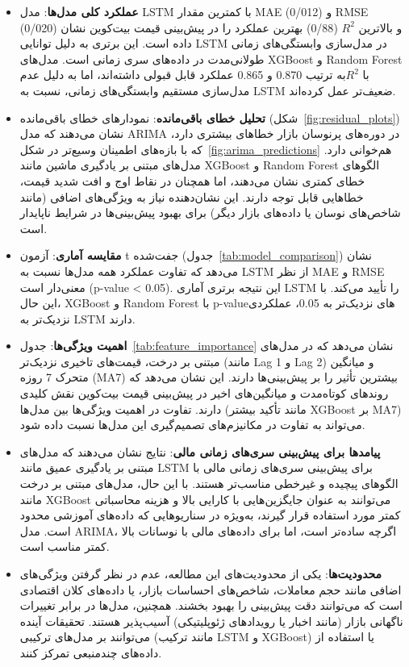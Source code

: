 \begin{itemize}
	\item \textbf{عملکرد کلی مدل‌ها}: مدل LSTM با کمترین مقدار MAE (0/012) و RMSE (0/020) و بالاترین $ R^2 $ (0/88) بهترین عملکرد را در پیش‌بینی قیمت بیت‌کوین نشان داده است. این برتری به دلیل توانایی LSTM در مدل‌سازی وابستگی‌های زمانی طولانی‌مدت در داده‌های سری زمانی است. مدل‌های XGBoost و Random Forest با $ R^2 $به ترتیب 0.870 و 0.865 عملکرد قابل قبولی داشته‌اند، اما به دلیل عدم مدل‌سازی مستقیم وابستگی‌های زمانی، نسبت به LSTM ضعیف‌تر عمل کرده‌اند.
	
	\item \textbf{تحلیل خطای باقی‌مانده}: نمودارهای خطای باقی‌مانده (شکل~\ref{fig:residual_plots}) نشان می‌دهند که مدل ARIMA در دوره‌های پرنوسان بازار خطاهای بیشتری دارد، که با بازه‌های اطمینان وسیع‌تر در شکل~\ref{fig:arima_predictions} هم‌خوانی دارد. مدل‌های مبتنی بر یادگیری ماشین مانند XGBoost و Random Forest الگوهای خطای کمتری نشان می‌دهند، اما همچنان در نقاط اوج و افت شدید قیمت، خطاهایی قابل توجه دارند. این نشان‌دهنده نیاز به ویژگی‌های اضافی (مانند شاخص‌های نوسان یا داده‌های بازار دیگر) برای بهبود پیش‌بینی‌ها در شرایط ناپایدار است.
	
	\item \textbf{مقایسه آماری}: آزمون t جفت‌شده (جدول~\ref{tab:model_comparison}) نشان می‌دهد که تفاوت عملکرد همه مدل‌ها نسبت به LSTM از نظر MAE و RMSE معنی‌دار است (p-value < 0.05). این نتیجه برتری آماری LSTM را تأیید می‌کند. با این حال، XGBoost و Random Forest با p-value‌های نزدیک‌تر به 0.05، عملکردی نزدیک‌تر به LSTM دارند.
	
	\item \textbf{اهمیت ویژگی‌ها}: جدول~\ref{tab:feature_importance} نشان می‌دهد که در مدل‌های مبتنی بر درخت، قیمت‌های تاخیری نزدیک‌تر (مانند Lag 1 و Lag 2) و میانگین متحرک 7 روزه (MA7) بیشترین تأثیر را بر پیش‌بینی‌ها دارند. این نشان می‌دهد که روندهای کوتاه‌مدت و میانگین‌های اخیر در پیش‌بینی قیمت بیت‌کوین نقش کلیدی دارند. تفاوت در اهمیت ویژگی‌ها بین مدل‌ها (مانند تأکید بیشتر XGBoost بر MA7) می‌تواند به تفاوت در مکانیزم‌های تصمیم‌گیری این مدل‌ها نسبت داده شود.
	
	\item \textbf{پیامدها برای پیش‌بینی سری‌های زمانی مالی}: نتایج نشان می‌دهند که مدل‌های مبتنی بر یادگیری عمیق مانند LSTM برای پیش‌بینی سری‌های زمانی مالی با الگوهای پیچیده و غیرخطی مناسب‌تر هستند. با این حال، مدل‌های مبتنی بر درخت مانند XGBoost می‌توانند به عنوان جایگزین‌هایی با کارایی بالا و هزینه محاسباتی کمتر مورد استفاده قرار گیرند، به‌ویژه در سناریوهایی که داده‌های آموزشی محدود است. مدل ARIMA، اگرچه ساده‌تر است، اما برای داده‌های مالی با نوسانات بالا کمتر مناسب است.
	
	\item \textbf{محدودیت‌ها}: یکی از محدودیت‌های این مطالعه، عدم در نظر گرفتن ویژگی‌های اضافی مانند حجم معاملات، شاخص‌های احساسات بازار، یا داده‌های کلان اقتصادی است که می‌توانند دقت پیش‌بینی را بهبود بخشند. همچنین، مدل‌ها در برابر تغییرات ناگهانی بازار (مانند اخبار یا رویدادهای ژئوپلیتیکی) آسیب‌پذیر هستند. تحقیقات آینده می‌توانند بر مدل‌های ترکیبی (مانند ترکیب LSTM و XGBoost) یا استفاده از داده‌های چندمنبعی تمرکز کنند.
\end{itemize}

